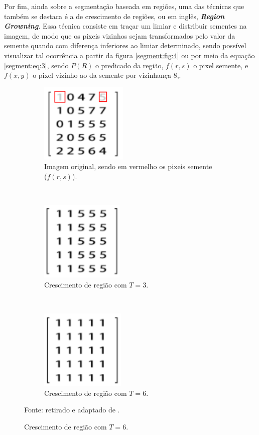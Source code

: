 Por fim, ainda sobre a segmentação baseada em regiões, uma das técnicas que também se destaca é a de crescimento de regiões, ou em inglês, \textbf{\textit{Region Growning}}. Essa técnica consiste em traçar um limiar e distribuir sementes na imagem, de modo que os pixeis vizinhos sejam transformados pelo valor da semente quando com diferença inferiores ao limiar determinado, sendo possível visualizar tal ocorrência a partir da figura \ref{segment:fig:4} ou por meio da equação \ref{segment:eq:3}, sendo $P(R)$ o predicado da região, $f(r,s)$ o pixel semente, e $f(x,y)$ o pixel vizinho ao da semente por vizinhança-8,.

\begin{figure}[H]
   \caption{Crescimento de região.}
   \centering
   \label{segment:fig:4}
    \begin{subfigure}[t]{0.45\textwidth}
        \centering
        \includegraphics[height=1.5in]{recursos/imagens/image_seg/m1.png}
        \caption{Imagem original, sendo em vermelho os pixeis semente ($f(r,s)$).}
        \label{segment:fig:4.1}
    \end{subfigure}
    ~ 
    \begin{subfigure}[t]{0.45\textwidth}
        \centering
        \includegraphics[height=1.5in]{recursos/imagens/image_seg/m2.png}
        \caption{Crescimento de região com $T = 3$.}
        \label{segment:fig:4.2}
    \end{subfigure}
    ~ 

    \begin{subfigure}[t]{0.45\textwidth}
        \centering
        \includegraphics[height=1.5in]{recursos/imagens/image_seg/m3.png}
        \caption{Crescimento de região com $T = 6$.}
        \label{segment:fig:4.3}
    \end{subfigure}

    \vspace*{1 cm}
    Fonte: retirado e adaptado de \cite{Yuheng2017ImageOverview}.
\end{figure}

